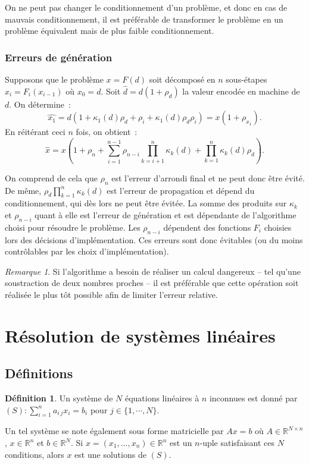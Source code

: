 \documentclass{article}
\theoremstyle{definition}
\newtheorem{déf}[thm]{Définition}
\theoremstyle{remark}
\newtheorem*{rmq}{Remarque}
\newcommand{\R}{\mathbb R}
\begin{document}
		On ne peut pas changer le conditionnement d'un problème, et donc en cas de mauvais conditionnement, il est préférable de transformer le problème en un
		problème équivalent mais de plus faible conditionnement.

		\subsubsection{Erreurs de génération}
		Supposons que le problème $x = F(d)$ soit décomposé en $n$ sous-étapes $x_i = F_i(x_{i-1})$ où $x_0 = d$. Soit $\widehat d = d(1+\rho_d)$ la valeur
		encodée en machine de $d$. On détermine~:
		\[\widehat {x_1} = d(1 + \kappa_1(d)\rho_d + \rho_i + \kappa_1(d)\rho_d\rho_i) = x(1 + \rho_{x_1}).\]
		En réitérant ceci $n$ fois, on obtient~:
		\[\widehat x = x\left(1 + \rho_n + \sum_{i=1}^{n-1}\rho_{n-i}\prod_{k=i+1}^{n}\kappa_k(d) + \prod_{k=1}^n\kappa_k(d)\rho_d\right).\]

		On comprend de cela que $\rho_n$ est l'erreur d'arrondi final et ne peut donc être évité. De même, $\rho_d\prod_{k=1}^n\kappa_k(d)$ est l'erreur de
		propagation et dépend du conditionnement, qui dès lors ne peut être évitée. La somme des produits sur $\kappa_k$ et $\rho_{n-i}$ quant à elle est
		l'erreur de génération et est dépendante de l'algorithme choisi pour résoudre le problème. Les $\rho_{n-i}$ dépendent des fonctions $F_i$ choisies lors
		des décisions d'implémentation. Ces erreurs sont donc évitables (ou du moins contrôlables par les choix d'implémentation).

		\begin{rmq} Si l'algorithme a besoin de réaliser un calcul dangereux -- tel qu'une soustraction de deux nombres proches -- il est préférable que cette
		opération soit réalisée le plus tôt possible afin de limiter l'erreur relative.
		\end{rmq}

\newpage
\section{Résolution de systèmes linéaires}\label{sec:systèmeslinéaires}
	\subsection{Définitions}
		\begin{déf}Un système de $N$ équations linéaires à $n$ inconnues est donné par $(S) : \sum_{i=1}^na_{i\,j}x_i = b_i$ pour $j \in \{1, \dotsb, N\}$.

		Un tel système se note également sous forme matricielle par $Ax = b$ où $A \in \R^{N \times n}$, $x \in \R^n$ et $b \in \R^N$.
		Si $x = (x_1, \dotsc, x_n) \in \R^n$ est un $n$-uple satisfaisant ces $N$ conditions, alors $x$ est une solutions de $(S)$.
		\end{déf}
\end{document}
